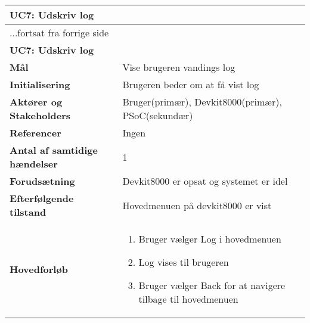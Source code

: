 \begin{center} \centering
	\begin{longtable}{|p{6cm}|p{8cm}|}  %
	\hline
		\multicolumn{2}{|l|}{\textbf{UC7: Udskriv log}} \\\hline %
		\endfirsthead
		
		\multicolumn{2}{l}{...fortsat fra forrige side} \\ \hline %
		\multicolumn{2}{|l|}{\textbf{UC7: Udskriv log}} \\\hline %
		\endhead	
		
		\textbf{Mål}								&Vise brugeren vandings log			\\\hline
		\textbf{Initialisering}					&Brugeren beder om at få vist log			\\\hline
		\textbf{Aktører og Stakeholders}			&Bruger(primær), Devkit8000(primær), PSoC(sekundær)			\\\hline
		\textbf{Referencer}						&Ingen			\\\hline
		\textbf{Antal af samtidige hændelser}	&1			\\\hline
		\textbf{Forudsætning}					&Devkit8000 er opsat og systemet er idel	\\\hline
		\textbf{Efterfølgende tilstand}			&Hovedmenuen på devkit8000 er vist			\\\hline
		\textbf{Hovedforløb}					
			&\begin{enumerate}
	
				\item Bruger vælger Log i hovedmenuen 
				
				\item Log vises til brugeren
				
				\item Bruger vælger Back for at navigere tilbage til hovedmenuen
	
			\end{enumerate}\\\hline
	\end{longtable}
	\label{UC7} 
\end{center}

